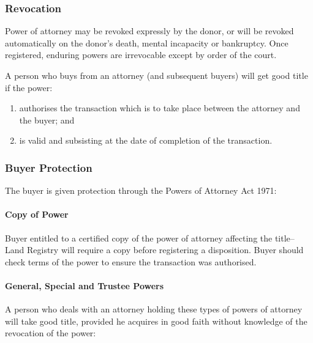 \documentclass[
]{article}
\providecommand{\tightlist}{%
  \setlength{\itemsep}{0pt}\setlength{\parskip}{0pt}}
\begin{document}
\hypertarget{revocation}{%
\subsubsection{Revocation}\label{revocation}}

Power of attorney may be revoked expressly by the donor, or will be
revoked automatically on the donor's death, mental incapacity or
bankruptcy. Once registered, enduring powers are irrevocable except by
order of the court.

A person who buys from an attorney (and subsequent buyers) will get good
title if the power:

\begin{enumerate}
\def\labelenumi{\arabic{enumi}.}
\tightlist
\item
  authorises the transaction which is to take place between the attorney
  and the buyer; and
\item
  is valid and subsisting at the date of completion of the transaction.
\end{enumerate}

\hypertarget{buyer-protection}{%
\subsubsection{Buyer Protection}\label{buyer-protection}}

The buyer is given protection through the Powers of Attorney Act 1971:

\hypertarget{copy-of-power}{%
\paragraph{Copy of Power}\label{copy-of-power}}

Buyer entitled to a certified copy of the power of attorney affecting
the title--Land Registry will require a copy before registering a
disposition. Buyer should check terms of the power to ensure the
transaction was authorised.

\hypertarget{general-special-and-trustee-powers}{%
\paragraph{General, Special and Trustee
Powers}\label{general-special-and-trustee-powers}}

A person who deals with an attorney holding these types of powers of
attorney will take good title, provided he acquires in good faith
without knowledge of the revocation of the power:
\end{document}

